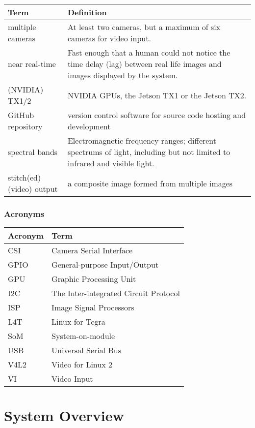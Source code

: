 \documentclass[letterpaper,10pt,serif,draftclsnofoot,onecolumn,compsoc,titlepage]{IEEEtran}
\begin{document}
\begin{tabular}{|l|p{11cm}|}
	\hline
	\textbf{Term} & \textbf{Definition}\\
	\hline
	multiple cameras & At least two cameras, but a maximum of six cameras for 
	video input.\\
	\hline
	near real-time & Fast enough that a human could not notice the time 
	delay (lag) between \newline real life images and images displayed by the system.\\
	\hline
	(NVIDIA) TX1/2 & NVIDIA GPUs, the Jetson TX1 or the Jetson TX2.\\
	\hline
	GitHub repository & version control software for source code hosting and development\\
	\hline
	spectral bands & Electromagnetic frequency ranges; different 
	spectrums of light, including \newline but not limited to infrared 
	and visible light.\\
	\hline
	stitch(ed) (video) output & a composite image formed from multiple images\\
	\hline
\end{tabular}

\subsubsection{Acronyms}

\begin{tabular}{|l|l|}
	\hline
	\textbf{Acronym} & \textbf{Term}\\
	\hline
	CSI & Camera Serial Interface\\
	\hline
	GPIO & General-purpose Input/Output\\
	\hline
	GPU & Graphic Processing Unit\\
	\hline
	I2C & The Inter-integrated Circuit Protocol\\
	\hline
	ISP & Image Signal Processors\\
	\hline
	L4T & Linux for Tegra \\
	\hline
	SoM & System-on-module\\
	\hline
	USB & Universal Serial Bus\\
	\hline
	V4L2 & Video for Linux 2 \\
	\hline
	VI & Video Input\\
	\hline
\end{tabular}

\newpage
\section{System Overview}  
\end{document}
